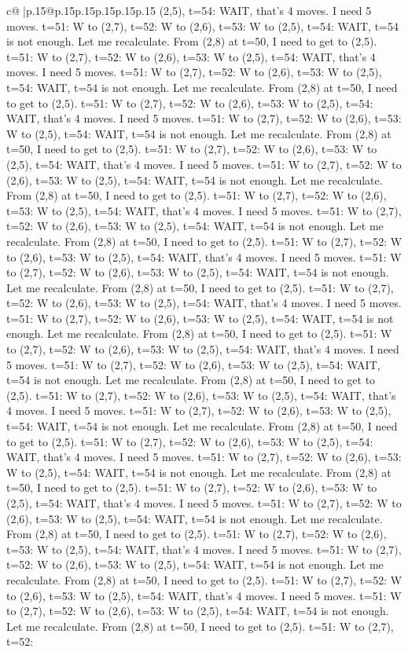 \documentclass{article}
\begin{document}
{\begin{supertabular}{c@{$\;$}|p{.15\linewidth}@{}p{.15\linewidth}p{.15\linewidth}p{.15\linewidth}p{.15\linewidth}p{.15\linewidth}}
{{{(2,5), t=54: WAIT, that's 4 moves. I need 5 moves. t=51: W to (2,7), t=52: W to (2,6), t=53: W to (2,5), t=54: WAIT, t=54 is not enough. Let me recalculate. From (2,8) at t=50, I need to get to (2,5). t=51: W to (2,7), t=52: W to (2,6), t=53: W to (2,5), t=54: WAIT, that's 4 moves. I need 5 moves. t=51: W to (2,7), t=52: W to (2,6), t=53: W to (2,5), t=54: WAIT, t=54 is not enough. Let me recalculate. From (2,8) at t=50, I need to get to (2,5). t=51: W to (2,7), t=52: W to (2,6), t=53: W to (2,5), t=54: WAIT, that's 4 moves. I need 5 moves. t=51: W to (2,7), t=52: W to (2,6), t=53: W to (2,5), t=54: WAIT, t=54 is not enough. Let me recalculate. From (2,8) at t=50, I need to get to (2,5). t=51: W to (2,7), t=52: W to (2,6), t=53: W to (2,5), t=54: WAIT, that's 4 moves. I need 5 moves. t=51: W to (2,7), t=52: W to (2,6), t=53: W to (2,5), t=54: WAIT, t=54 is not enough. Let me recalculate. From (2,8) at t=50, I need to get to (2,5). t=51: W to (2,7), t=52: W to (2,6), t=53: W to (2,5), t=54: WAIT, that's 4 moves. I need 5 moves. t=51: W to (2,7), t=52: W to (2,6), t=53: W to (2,5), t=54: WAIT, t=54 is not enough. Let me recalculate. From (2,8) at t=50, I need to get to (2,5). t=51: W to (2,7), t=52: W to (2,6), t=53: W to (2,5), t=54: WAIT, that's 4 moves. I need 5 moves. t=51: W to (2,7), t=52: W to (2,6), t=53: W to (2,5), t=54: WAIT, t=54 is not enough. Let me recalculate. From (2,8) at t=50, I need to get to (2,5). t=51: W to (2,7), t=52: W to (2,6), t=53: W to (2,5), t=54: WAIT, that's 4 moves. I need 5 moves. t=51: W to (2,7), t=52: W to (2,6), t=53: W to (2,5), t=54: WAIT, t=54 is not enough. Let me recalculate. From (2,8) at t=50, I need to get to (2,5). t=51: W to (2,7), t=52: W to (2,6), t=53: W to (2,5), t=54: WAIT, that's 4 moves. I need 5 moves. t=51: W to (2,7), t=52: W to (2,6), t=53: W to (2,5), t=54: WAIT, t=54 is not enough. Let me recalculate. From (2,8) at t=50, I need to get to (2,5). t=51: W to (2,7), t=52: W to (2,6), t=53: W to (2,5), t=54: WAIT, that's 4 moves. I need 5 moves. t=51: W to (2,7), t=52: W to (2,6), t=53: W to (2,5), t=54: WAIT, t=54 is not enough. Let me recalculate. From (2,8) at t=50, I need to get to (2,5). t=51: W to (2,7), t=52: W to (2,6), t=53: W to (2,5), t=54: WAIT, that's 4 moves. I need 5 moves. t=51: W to (2,7), t=52: W to (2,6), t=53: W to (2,5), t=54: WAIT, t=54 is not enough. Let me recalculate. From (2,8) at t=50, I need to get to (2,5). t=51: W to (2,7), t=52: W to (2,6), t=53: W to (2,5), t=54: WAIT, that's 4 moves. I need 5 moves. t=51: W to (2,7), t=52: W to (2,6), t=53: W to (2,5), t=54: WAIT, t=54 is not enough. Let me recalculate. From (2,8) at t=50, I need to get to (2,5). t=51: W to (2,7), t=52: W to (2,6), t=53: W to (2,5), t=54: WAIT, that's 4 moves. I need 5 moves. t=51: W to (2,7), t=52: W to (2,6), t=53: W to (2,5), t=54: WAIT, t=54 is not enough. Let me recalculate. From (2,8) at t=50, I need to get to (2,5). t=51: W to (2,7), t=52: W to (2,6), t=53: W to (2,5), t=54: WAIT, that's 4 moves. I need 5 moves. t=51: W to (2,7), t=52: W to (2,6), t=53: W to (2,5), t=54: WAIT, t=54 is not enough. Let me recalculate. From (2,8) at t=50, I need to get to (2,5). t=51: W to (2,7), t=52: }}}
\end{supertabular}}
\end{document}
